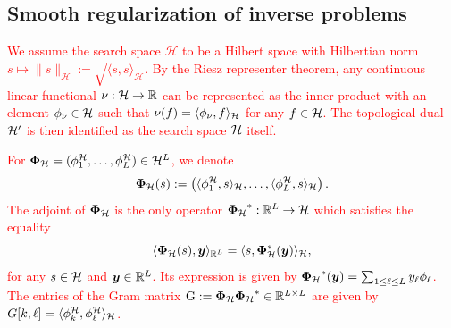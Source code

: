 \documentclass[12pt]{article}
\begin{document}
    
    \subsection{Smooth regularization of inverse problems}

    \textcolor{red}{We assume the search space $\mathcal{H}$ to be a Hilbert space with Hilbertian norm $s \mapsto \| s \|_\mathcal{H} := \sqrt{\langle s, s \rangle_{\mathcal{H}}}$. By the Riesz representer theorem, any continuous linear functional $\nu: \mathcal{H} \to \mathbb{R}$ can be represented as the inner product with an element $\phi_\nu \in \mathcal{H}$ such that $\nu(f) = \langle \phi_\nu, f \rangle_{\mathcal{H}}$ for any $f \in \mathcal{H}$. The topological dual $\mathcal{H}'$ is then identified as the search space $\mathcal{H}$ itself.}

    \textcolor{red}{
    For ${\bm{\Phi}_\mathcal{H}}= (\phi^\mathcal{H}_1 ,\ldots , \phi^\mathcal{H}_L) \in \mathcal{H}^L$, we denote
    \begin{equation}
        {\bm{\Phi}_\mathcal{H}}(s) := \left( \langle \phi^\mathcal{H}_1, s \rangle_{\mathcal{H}} , \ldots , \langle \phi^\mathcal{H}_L, s \rangle_{\mathcal{H}} \right). 
        \label{eq:phi-hilbert}
    \end{equation}
    The adjoint of ${\bm{\Phi}_\mathcal{H}}$ is the only operator ${\bm{\Phi}_\mathcal{H}}^* : \mathbb{R}^L \rightarrow \mathcal{H}$ which satisfies the equality %
    \begin{equation*}
        \langle \bm{\Phi}_\mathcal{H}(s), \bm{y}\rangle_{\mathbb{R}^L} = \langle s, \bm{\Phi}_\mathcal{H}^*(\bm{y})\rangle_{\mathcal{H}},
    \end{equation*}
    for any $s \in \mathcal{H}$ and $\bm{y}\in\mathbb{R}^L$.
    Its expression is given by ${\bm{\Phi}_\mathcal{H}}^* (\bm{y}) = \sum_{1 \leq \ell \leq L} y_\ell \phi_\ell$.
    The entries of the Gram matrix $\mathrm{G} := {\bm{\Phi}_\mathcal{H}} {\bm{\Phi}_\mathcal{H}}^* \in \mathbb{R}^{L\times L}$ are given by $G[k,\ell] = \langle \phi^\mathcal{H}_k , \phi_\ell^{\mathcal{H}} \rangle_{\mathcal{H}}$.}
\end{document}
